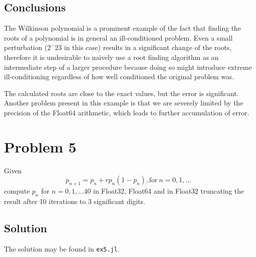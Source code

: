 \documentclass[a4paper, 12pt]{article}
\newcommand{\code}[1]{\texttt{#1}}
\begin{document}
\subsection{Conclusions}
The Wilkinson polynomial is a prominent example of the fact that finding the
roots of a polynomial is in general an ill-conditioned problem. Even a small
perturbation ($2^-23$ in this case) results in a significant change of the
roots, therefore it is undesirable to naively use a root finding algorithm as an
intermediate step of a larger procedure because doing so might introduce extreme
ill-conditioning regardless of how well conditioned the original problem was.

The calculated roots are close to the exact values, but the error is
significant. Another problem present in this example is that we are severely
limited by the precision of the Float64 arithmetic, which leads to further
accumulation of error.

\section{Problem 5}
Given
\begin{equation}
p_{n+1} = p_n + rp_n(1-p_n), \mathrm{for} \ n = 0, 1, ...
\end{equation}
compute $p_n$ for $n = 0, 1, ... 40$ in Float32, Float64 and in Float32
truncating the result after 10 iterations to 3 significant digits.

\subsection{Solution}
The solution may be found in \code{ex5.jl}.
\end{document}
